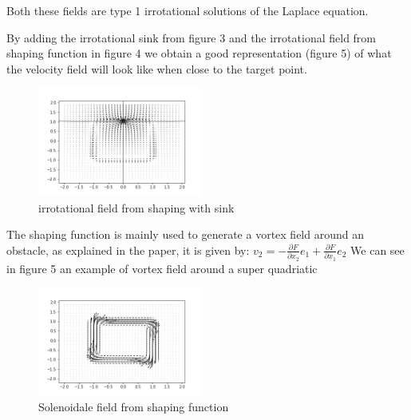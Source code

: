 Both these fields are type 1 irrotational solutions of the Laplace equation.

By adding the irrotational sink from figure 3 and the irrotational field from shaping function in figure 4 we obtain a good representation (figure 5) of what the velocity field will look like when close to the target point. 
\begin{figure}[h!]
    \centering
    \includegraphics[width=0.48\textwidth]{Images/irrotashapingwithsink.png}
    \caption{irrotational field from shaping with sink}
    \label{fig:irrotafromshapingwithsink}
\end{figure}

The shaping function is mainly used to generate a vortex field around an obstacle, as explained in the paper, it is given by: 
$v_2=-\frac{\partial{F}}{\partial{x_2}}e_1 + \frac{\partial{F}}{\partial{x_1}}e_2 $
We can see in figure 5 an example of vortex field around a super quadriatic
\begin{figure}[h!]
    \centering
    \includegraphics[width=0.48\textwidth]{Images/rotafromshaping.png}
    \caption{Solenoidale field from shaping function}
    \label{fig:rotafromshaping}
\end{figure}
